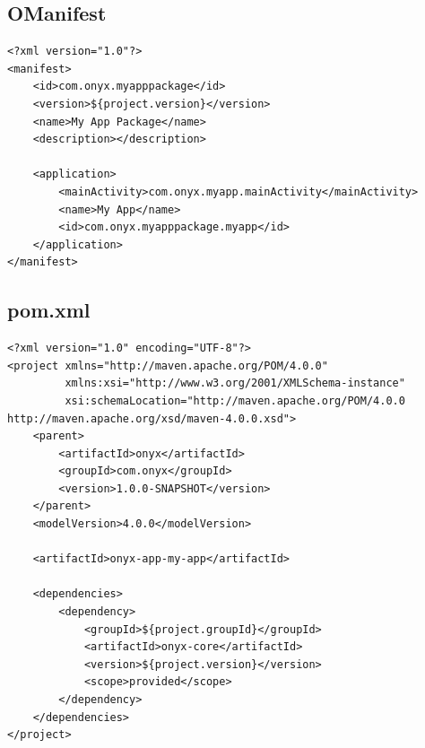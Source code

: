 \subsection{OManifest}


\begin{verbatim}
<?xml version="1.0"?>
<manifest>
    <id>com.onyx.myapppackage</id>
    <version>${project.version}</version>
    <name>My App Package</name>
    <description></description>

    <application>
        <mainActivity>com.onyx.myapp.mainActivity</mainActivity>
        <name>My App</name>
        <id>com.onyx.myapppackage.myapp</id>
    </application>
</manifest>
\end{verbatim}


\subsection{pom.xml}
\begin{verbatim}
<?xml version="1.0" encoding="UTF-8"?>
<project xmlns="http://maven.apache.org/POM/4.0.0"
         xmlns:xsi="http://www.w3.org/2001/XMLSchema-instance"
         xsi:schemaLocation="http://maven.apache.org/POM/4.0.0 http://maven.apache.org/xsd/maven-4.0.0.xsd">
    <parent>
        <artifactId>onyx</artifactId>
        <groupId>com.onyx</groupId>
        <version>1.0.0-SNAPSHOT</version>
    </parent>
    <modelVersion>4.0.0</modelVersion>

    <artifactId>onyx-app-my-app</artifactId>

    <dependencies>
        <dependency>
            <groupId>${project.groupId}</groupId>
            <artifactId>onyx-core</artifactId>
            <version>${project.version}</version>
            <scope>provided</scope>
        </dependency>
    </dependencies>
</project>
\end{verbatim}
